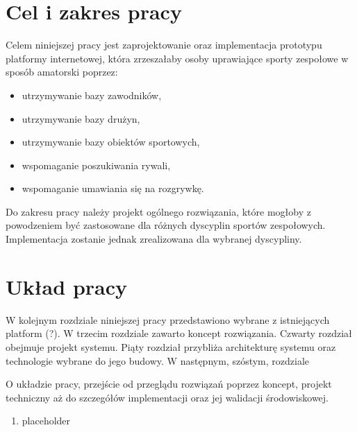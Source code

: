 \section{Cel i zakres pracy}

Celem niniejszej pracy jest zaprojektowanie oraz implementacja prototypu platformy internetowej, która zrzeszałaby osoby uprawiające sporty zespołowe w sposób amatorski poprzez:

\begin{itemize}
  \item utrzymywanie bazy zawodników,
  \item utrzymywanie bazy drużyn,
  \item utrzymywanie bazy obiektów sportowych,
  \item wspomaganie poszukiwania rywali,
  \item wspomaganie umawiania się na rozgrywkę.
\end{itemize} 

Do zakresu pracy należy projekt ogólnego rozwiązania, które mogłoby z powodzeniem być zastosowane dla różnych dyscyplin sportów zespołowych. Implementacja zostanie jednak zrealizowana dla wybranej dyscypliny.

\begin{comment}
Ze względu na duży rozwój

TODO O tym że projekt ogólny a implementacja dla wybranej dziedziny a konkretnie koszykówki 3 na 3 która budzi co raz większe zainteresowanie i np będzie na igrzyskach olimpijskich. Wybór ze względu na popularność dyscypliny i brak dla niej istniejącego rozwiązania\cite{JS07}).
\end{comment}


\section{Układ pracy}

W kolejnym rozdziale niniejszej pracy przedstawiono wybrane z istniejących platform (?). W trzecim rozdziale zawarto koncept rozwiązania. Czwarty rozdział obejmuje projekt systemu. Piąty rozdział przybliża architekturę systemu oraz technologie wybrane do jego budowy. W następnym, szóstym, rozdziale

O układzie pracy, przejście od przeglądu rozwiązań poprzez koncept, projekt techniczny aż do szczegółów implementacji oraz jej walidacji środowiskowej.

\begin{enumerate}
\item placeholder
\end{enumerate}